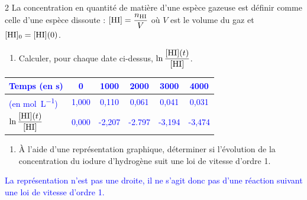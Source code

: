 \documentclass[a4paper,11pt,fleqn]{article}%
\begin{document}
\begin{multicols}{2}
La concentration en quantité de matière d'une espèce gazeuse est définir comme celle d'une espèce dissoute : $[\ce{HI}] = \dfrac{n_{\ce{HI}}}{V}$ où $V$ est le volume du gaz et $[\ce{HI}]_0 = [\ce{HI}](0)$.
\begin{enumerate}
    \item Calculer, pour chaque date ci-dessus, $\ln{\dfrac{[\ce{HI}](t)}{[\ce{HI}]}}$.
\end{enumerate}
\textcolor{blue}{
    \begin{center}
    \begin{tabular}{|>{\centering}m{.15\linewidth}|c|c|c|c|c|}
    \hline Temps (en s) & 0 & 1000 & 2000 & 3000 & 4000\\
    \hline [\ce{HI}] (en \unit{\mole\per\liter}) & 1,000 & 0,110 & 0,061 & 0,041 & 0,031\\
    \hline \small $\ln{\dfrac{[\ce{HI}](t)}{[\ce{HI}]}}$ & 0,000 & -2,207 & -2.797 &-3,194& -3,474\\ \hline
    \end{tabular}
\end{center}}
\begin{enumerate}[resume]
    \item À l'aide d'une représentation graphique, déterminer si l'évolution de la concentration du iodure d'hydrogène suit une loi de vitesse d'ordre 1.
\end{enumerate}
\begin{center}
\end{center}

\textcolor{blue}{La représentation n'est pas une droite, il ne s'agit donc pas d'une réaction suivant une loi de vitesse d'ordre 1.}


\end{multicols}
\end{document}
